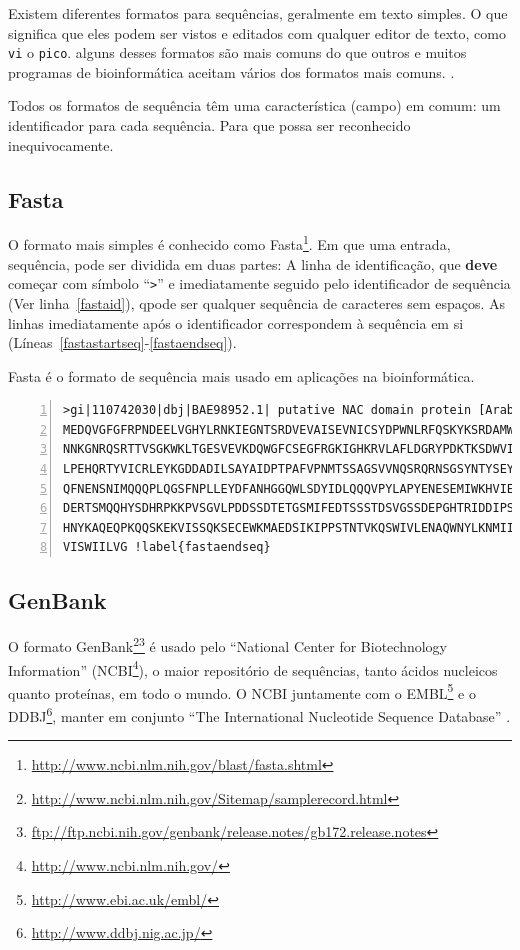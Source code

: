 \documentclass[letter,11pt]{book}
\begin{document}
Existem diferentes formatos para sequências, geralmente em texto simples. O que significa que eles podem ser vistos e editados com qualquer editor de texto, como \Verb+vi+ o \Verb+pico+. alguns desses formatos são mais comuns do que outros e muitos programas de bioinformática aceitam vários dos formatos mais comuns. \citep{Leonard2007}.

Todos os formatos de sequência têm uma característica (campo) em comum: um identificador para cada sequência. Para que possa ser reconhecido inequivocamente.

\subsection{Fasta}

O formato mais simples é conhecido como Fasta\footnote{\url{http://www.ncbi.nlm.nih.gov/blast/fasta.shtml}}. Em que uma entrada, sequência, pode ser dividida em duas partes: A linha de identificação, que \textbf{deve} começar com símbolo ``\Verb+>+'' e imediatamente seguido pelo identificador de sequência (Ver linha~\ref{fastaid}), qpode ser qualquer sequência de caracteres sem espaços. As linhas imediatamente após o identificador correspondem à sequência em si (Líneas~\ref{fastastartseq}-\ref{fastaendseq}).

Fasta é o formato de sequência mais usado em aplicações na bioinformática.
 
\begin{Verbatim}[commandchars=!\{\},numbers=left,firstnumber=last,label=Secuencia en formato FastA,frame=topline,fontsize=\scriptsize]
>gi|110742030|dbj|BAE98952.1| putative NAC domain protein [Arabidopsis thaliana] !label{fastaid}
MEDQVGFGFRPNDEELVGHYLRNKIEGNTSRDVEVAISEVNICSYDPWNLRFQSKYKSRDAMWYFFSRRE !label{fastastartseq}
NNKGNRQSRTTVSGKWKLTGESVEVKDQWGFCSEGFRGKIGHKRVLAFLDGRYPDKTKSDWVIHEFHYDL
LPEHQRTYVICRLEYKGDDADILSAYAIDPTPAFVPNMTSSAGSVVNQSRQRNSGSYNTYSEYDSANHGQ
QFNENSNIMQQQPLQGSFNPLLEYDFANHGGQWLSDYIDLQQQVPYLAPYENESEMIWKHVIEENFEFLV
DERTSMQQHYSDHRPKKPVSGVLPDDSSDTETGSMIFEDTSSSTDSVGSSDEPGHTRIDDIPSLNIIEPL
HNYKAQEQPKQQSKEKVISSQKSECEWKMAEDSIKIPPSTNTVKQSWIVLENAQWNYLKNMIIGVLLFIS
VISWIILVG !label{fastaendseq}
\end{Verbatim} 

\subsection{GenBank}

O formato GenBank\footnote{\url{http://www.ncbi.nlm.nih.gov/Sitemap/samplerecord.html}}\footnote{\url{ftp://ftp.ncbi.nih.gov/genbank/release.notes/gb172.release.notes}} é usado pelo ``National Center for Biotechnology Information'' (NCBI\footnote{\url{http://www.ncbi.nlm.nih.gov/}}), o maior repositório de sequências, tanto ácidos nucleicos quanto proteínas, em todo o mundo. O NCBI juntamente com o EMBL\footnote{\url{http://www.ebi.ac.uk/embl/}} e o DDBJ\footnote{\url{http://www.ddbj.nig.ac.jp/}},  manter em conjunto ``The International Nucleotide Sequence Database'' \citep{Mizrachi2008}.
\end{document}
